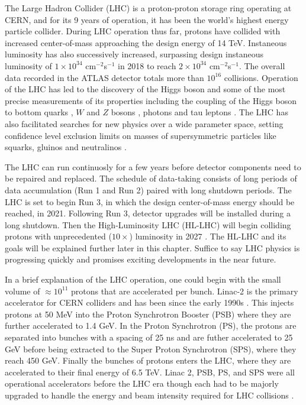  
The Large Hadron Collider (LHC) is a proton-proton storage ring operating at CERN, and for its 9 years of operation, it has been the world's highest energy particle collider. 
During LHC operation thus far, protons have collided with increased center-of-mass approaching the design energy of 14 TeV. Instaneous luminosity has also successively increased, surpassing design instaneous luminosity of $1\times10^{34}$ cm$^{-2}$s$^{-1}$ in 2018 to reach $2\times10^{34}$ cm$^{-2}$s$^{-1}$\cite{CERNnews1}. The overall data recorded in the ATLAS detector totals more than $10^{16}$ collisions. Operation of the LHC has led to the discovery of the Higgs boson and some of the most precise measurements of its properties including the coupling of the Higgs boson to bottom quarks \cite{Aaboud_2018_0}, $W$ and $Z$ bosons \cite{Aaboud_2019, Aaboud_2018}, photons \cite{Aaboud_2018_2} and tau leptons \cite{Aaboud_2019_2}. The LHC has also facilitated searches for new physics over a wide parameter space, setting confidence level exclusion limits on masses of supersymmetric particles like squarks, gluinos and neutralinos \cite{ATLAS-CONF-2019-040}. 

The LHC can run continuosly for a few years before detector components need to be repaired and replaced. The schedule of data-taking consists of long periods of data accumulation (Run 1 and Run 2) paired with long shutdown periods. The LHC is set to begin Run 3, in which the design center-of-mass energy should be reached, in 2021. Following Run 3, detector upgrades will be installed during a long shutdown. Then the High-Luminosity LHC (HL-LHC) will begin colliding protons with unprecedented ($10\times$) luminosity in 2027 \cite{CERNnews2}. The HL-LHC and its goals will be explained further later in this chapter. Suffice to say LHC physics is progressing quickly and promises exciting developments in the near future. 

In a brief explanation of the LHC operation, one could begin with the small volume of $\approx 10^{11}$ protons that are accelerated per bunch. Linac-2 is the primary accelerator for CERN colliders and has been since the early 1990s \cite{LHCInjector}. This injects protons at 50 MeV into the Proton Synchrotron Booster (PSB) where they are further accelerated to 1.4 GeV. In the Proton Synchrotron (PS), the protons are separated into bunches with a spacing of 25 ns and are futher accelerated to 25 GeV before being extracted to the Super Proton Synchrotron (SPS), where they reach 450 GeV. Finally the bunches of protons enters the LHC, where they are accelerated to their final energy of 6.5 TeV. Linac 2, PSB, PS, and SPS were all operational accelerators before the LHC era though each had to be majorly upgraded to handle the energy and beam intensity required for LHC collisions \cite{LHCInjector}. 

